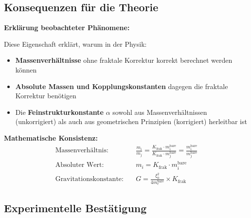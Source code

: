 \documentclass[12pt,a4paper]{article}
\begin{document}
	\subsection{Konsequenzen für die Theorie}
	
	\begin{derivation}
		\textbf{Erklärung beobachteter Phänomene:}
		
		Diese Eigenschaft erklärt, warum in der Physik:
		
		\begin{itemize}
			\item \textbf{Massenverhältnisse} ohne fraktale Korrektur korrekt berechnet werden können
			\item \textbf{Absolute Massen und Kopplungskonstanten} dagegen die fraktale Korrektur benötigen
			\item Die \textbf{Feinstrukturkonstante} $\alpha$ sowohl aus Massenverhältnissen (unkorrigiert) als auch aus geometrischen Prinzipien (korrigiert) herleitbar ist
		\end{itemize}
		
		\textbf{Mathematische Konsistenz:}
		\begin{align}
			\text{Massenverhältnis:} &\quad \frac{m_i}{m_j} = \frac{K_{\text{frak}} \cdot m_i^{\text{bare}}}{K_{\text{frak}} \cdot m_j^{\text{bare}}} = \frac{m_i^{\text{bare}}}{m_j^{\text{bare}}} \\
			\text{Absoluter Wert:} &\quad m_i = K_{\text{frak}} \cdot m_i^{\text{bare}} \\
			\text{Gravitationskonstante:} &\quad G = \frac{\xi_0^2}{4 m_e^{\text{bare}}} \times K_{\text{frak}}
		\end{align}
	\end{derivation}
	
	\subsection{Experimentelle Bestätigung}
	
\end{document}
